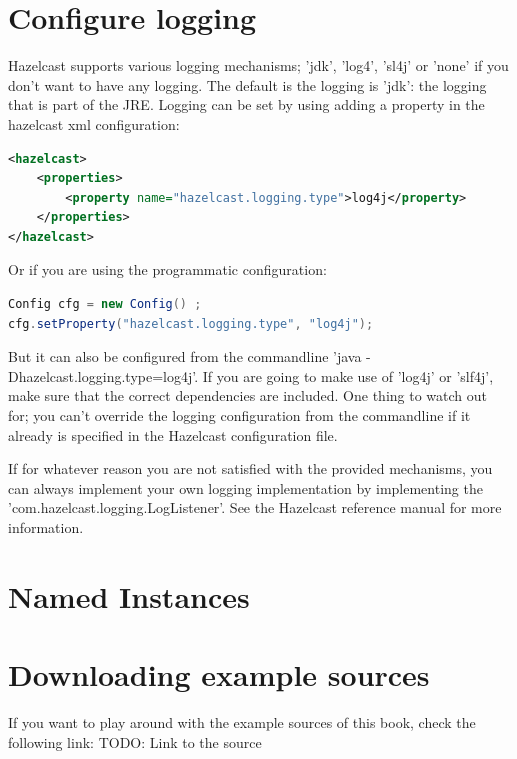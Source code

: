 \section{Configure logging}
Hazelcast supports various logging mechanisms; 'jdk', 'log4', 'sl4j' or 'none' if you don't want to have any logging. The default is the logging is 'jdk': the logging that is part of the JRE. Logging can be set by using adding a property in the hazelcast xml configuration:
\begin{lstlisting}[language=xml]
<hazelcast>
    <properties>
        <property name="hazelcast.logging.type">log4j</property>
    </properties>
</hazelcast>
\end{lstlisting}
Or if you are using the programmatic configuration:
\begin{lstlisting}[language=java]
Config cfg = new Config() ;
cfg.setProperty("hazelcast.logging.type", "log4j");
\end{lstlisting}
But it can also be configured from the commandline 'java -Dhazelcast.logging.type=log4j'. If you are going to make use of 'log4j' or 'slf4j', make sure that the correct dependencies are included. One thing to watch out for; you can't override the logging configuration from the commandline if it already is specified in the Hazelcast configuration file.

If for whatever reason you are not satisfied with the provided mechanisms, you can always implement your own logging implementation by implementing the 'com.hazelcast.logging.LogListener'. See the Hazelcast reference manual for more information.
\section{Named Instances}

\section{Downloading example sources}
If you want to play around with the example sources of this book, check the following link:
TODO: Link to the source
